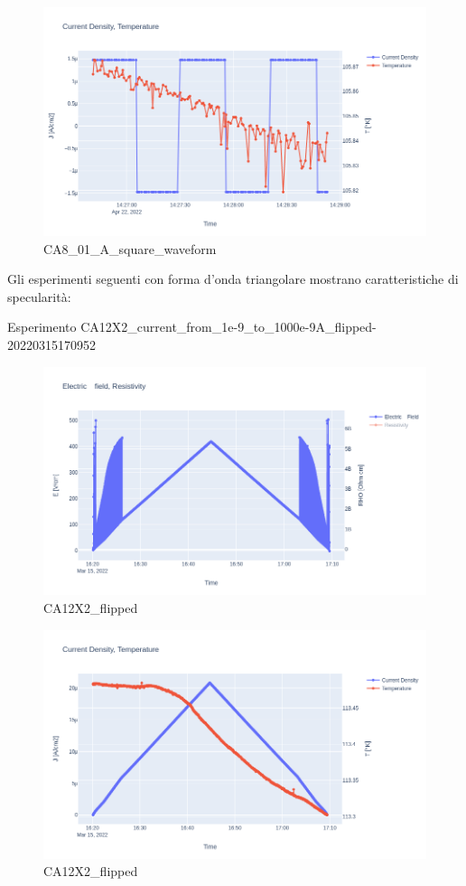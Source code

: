 \documentclass[11pt]{article}
\begin{document}
\begin{figure}
\centering
\includegraphics{CA8_01_A_square-j_t.png}
\caption{CA8\_01\_A\_square\_waveform}
\end{figure}

Gli esperimenti seguenti con forma d'onda triangolare mostrano
caratteristiche di specularità:

Esperimento
CA12X2\_current\_from\_1e-9\_to\_1000e-9A\_flipped-20220315170952

\begin{figure}
\centering
\includegraphics{CA12X2_flipped-e.png}
\caption{CA12X2\_flipped}
\end{figure}

\begin{figure}
\centering
\includegraphics{CA12X2_flipped-j_t.png}
\caption{CA12X2\_flipped}
\end{figure}
\end{document}
